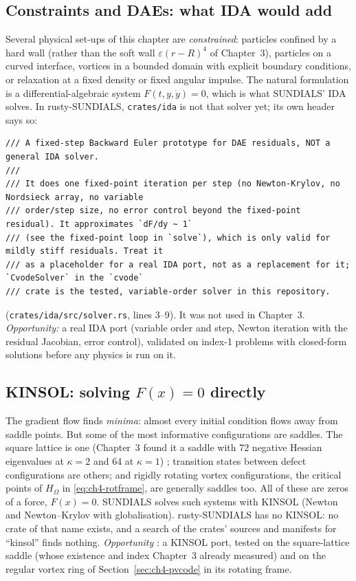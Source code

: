 \subsection{Constraints and DAEs: what IDA would add}
Several physical set-ups of this chapter are \emph{constrained}: particles confined by a hard wall (rather than the
soft wall $\varepsilon(r-R)^4$ of Chapter~3), particles on a curved interface, vortices in a bounded domain with
explicit boundary conditions, or relaxation at a fixed density or fixed angular impulse. The natural formulation is
a differential-algebraic system $F(t,y,\dot y)=0$, which is what SUNDIALS' IDA solves. In rusty-SUNDIALS,
\texttt{crates/ida} is not that solver yet; its own header says so:
\begin{lstlisting}
/// A fixed-step Backward Euler prototype for DAE residuals, NOT a general IDA solver.
///
/// It does one fixed-point iteration per step (no Newton-Krylov, no Nordsieck array, no variable
/// order/step size, no error control beyond the fixed-point residual). It approximates `dF/dy ~ 1`
/// (see the fixed-point loop in `solve`), which is only valid for mildly stiff residuals. Treat it
/// as a placeholder for a real IDA port, not as a replacement for it; `CvodeSolver` in the `cvode`
/// crate is the tested, variable-order solver in this repository.
\end{lstlisting}
(\texttt{crates/ida/src/solver.rs}, lines 3--9). It was not used in Chapter~3. \emph{Opportunity:} a real IDA port
(variable order and step, Newton iteration with the residual Jacobian, error control), validated on index-1
problems with closed-form solutions before any physics is run on it.

\subsection{KINSOL: solving \texorpdfstring{$F(x)=0$}{F(x) = 0} directly}
The gradient flow finds \emph{minima}: almost every initial condition flows away from saddle points. But some of
the most informative configurations are saddles. The square lattice is one (Chapter~3 found it a saddle with 72
negative Hessian eigenvalues at $\kappa=2$ and 64 at $\kappa=1$) \tierX; transition states between defect
configurations are others; and rigidly rotating vortex configurations, the critical points of $H_\Omega$ in
\eqref{eq:ch4-rotframe}, are generally saddles too. All of these are zeros of a force, $F(x)=0$. SUNDIALS solves
such systems with KINSOL (Newton and Newton--Krylov with globalisation). rusty-SUNDIALS has no KINSOL: no crate of
that name exists, and a search of the crates' sources and manifests for ``kinsol'' finds nothing. \emph{Opportunity}
\tierC: a KINSOL port, tested on the square-lattice saddle (whose existence and index Chapter~3 already measured)
and on the regular vortex ring of Section~\ref{sec:ch4-pvcode} in its rotating frame.

